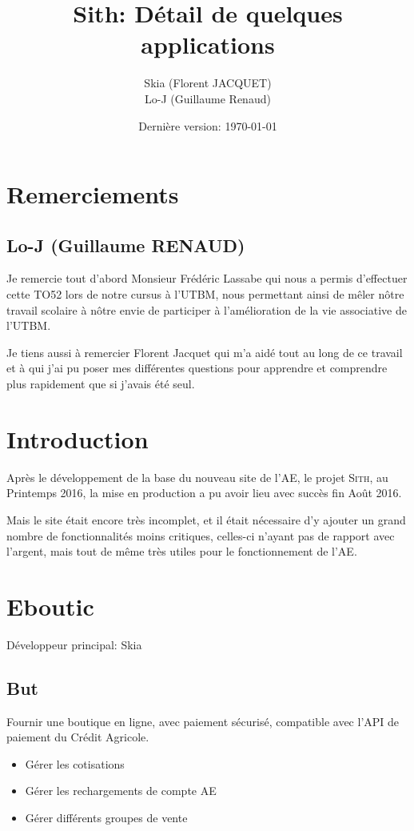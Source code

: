 \documentclass[a4paper]{report}
\title{Sith: Détail de quelques applications}
\author{Skia (Florent JACQUET)\\
Lo-J (Guillaume Renaud)}
\date{Dernière version: \today}
\begin{document}
\maketitle

\tableofcontents

\chapter*{Remerciements}
\section*{Lo-J (Guillaume RENAUD)}
\par Je remercie tout d’abord Monsieur Frédéric Lassabe qui nous a permis d’effectuer cette TO52 lors de notre cursus à l’UTBM, nous permettant ainsi de mêler nôtre travail scolaire à nôtre envie de participer à l’amélioration de la vie associative de l’UTBM.

\par Je tiens aussi à remercier Florent Jacquet qui m’a aidé tout au long de ce travail et à qui j’ai pu poser mes différentes questions pour apprendre et comprendre plus rapidement que si j’avais été seul.


\chapter{Introduction}
\par Après le développement de la base du nouveau site de l'AE, le projet \textsc{Sith}, au Printemps 2016, la mise en
production a pu avoir lieu avec succès fin Août 2016.

\par Mais le site était encore très incomplet, et il était nécessaire d'y ajouter un grand nombre de fonctionnalités
moins critiques, celles-ci n'ayant pas de rapport avec l'argent, mais tout de même très utiles pour le fonctionnement
de l'AE.

\chapter{Eboutic}
\label{sec:eboutic}
\par Développeur principal: Skia

\section{But}
\label{sub:but}
\par Fournir une boutique en ligne, avec paiement sécurisé, compatible avec l'API de paiement du Crédit Agricole.
\begin{itemize}
    \item Gérer les cotisations
    \item Gérer les rechargements de compte AE
    \item Gérer différents groupes de vente
\end{itemize}
\end{document}
